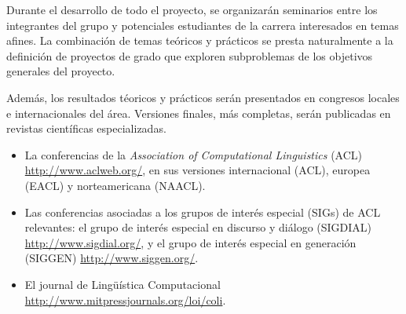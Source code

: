 
Durante el desarrollo de todo el proyecto, se organizar\'an seminarios
entre los integrantes del grupo y potenciales estudiantes de la carrera
interesados en temas afines.  La combinaci\'on de temas te\'oricos y
pr\'acticos se presta naturalmente a la definici\'on de proyectos de
grado que exploren subproblemas de los objetivos generales del proyecto.

Adem\'as, los resultados t\'eoricos y pr\'acticos ser\'an presentados en
congresos locales e internacionales del \'area.  Versiones finales, m\'as
completas, ser\'an publicadas en revistas cient\'ificas especializadas.

\begin{itemize}
\item La conferencias de la \emph{Association of Computational Linguistics}
(ACL) \url{http://www.aclweb.org/}, en sus versiones internacional (ACL),
europea (EACL) y norteamericana (NAACL). 

\item Las conferencias asociadas a los grupos de inter\'es especial (SIGs) de
ACL relevantes: el grupo de inter\'es especial en discurso y di\'alogo
(SIGDIAL) \url{http://www.sigdial.org/}, y el grupo de inter\'es especial en
generaci\'on (SIGGEN) \url{http://www.siggen.org/}. 

\item El journal de Ling\"u\'istica Computacional
\url{http://www.mitpressjournals.org/loi/coli}. 


\end{itemize}


